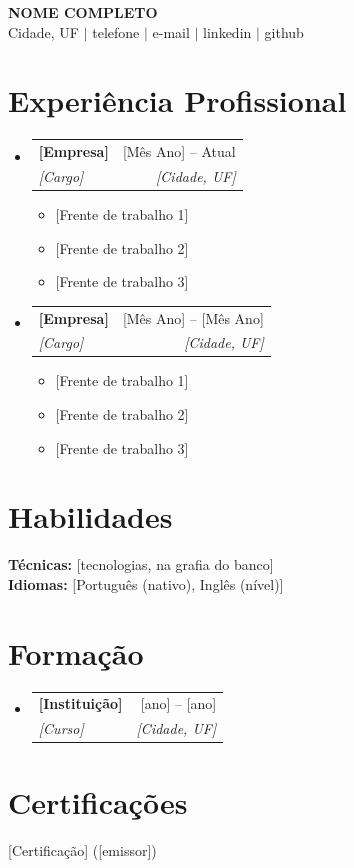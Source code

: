 \documentclass[a4paper,10pt]{article}
\makeatletter
\newcommand{\resumeItem}[1]{
  \item\small{#1 \vspace{-2pt}}
}
\newcommand{\resumeSubheading}[4]{
  \vspace{-1pt}\item
    \begin{tabular*}{\textwidth}[t]{l@{\extracolsep{\fill}}r}
      \textbf{#1} & \small #2 \\
      \textit{\small #3} & \textit{\small #4} \\
    \end{tabular*}\vspace{-5pt}
}
\newcommand{\resumeSubHeadingListStart}{\begin{itemize}[leftmargin=0in, label={}]}
\newcommand{\resumeSubHeadingListEnd}{\end{itemize}}
\newcommand{\resumeItemListStart}{\begin{itemize}[leftmargin=0.15in]}
\newcommand{\resumeItemListEnd}{\end{itemize}\vspace{-2pt}}
\makeatother
\begin{document}

\begin{center}
  {\LARGE \textbf{NOME COMPLETO}} \\[4pt]
  \small
  Cidade, UF $|$
  telefone $|$
  e-mail $|$
  linkedin $|$
  github
\end{center}

\section{Experiência Profissional}
\resumeSubHeadingListStart

  \resumeSubheading
    {[Empresa]}{[Mês Ano] -- Atual}
    {[Cargo]}{[Cidade, UF]}
  \resumeItemListStart
    \resumeItem{[Frente de trabalho 1]}
    \resumeItem{[Frente de trabalho 2]}
    \resumeItem{[Frente de trabalho 3]}
  \resumeItemListEnd

  \resumeSubheading
    {[Empresa]}{[Mês Ano] -- [Mês Ano]}
    {[Cargo]}{[Cidade, UF]}
  \resumeItemListStart
    \resumeItem{[Frente de trabalho 1]}
    \resumeItem{[Frente de trabalho 2]}
    \resumeItem{[Frente de trabalho 3]}
  \resumeItemListEnd

\resumeSubHeadingListEnd

\section{Habilidades}
\begin{itemize}[leftmargin=0in, label={}]
  \small{\item{
    \textbf{Técnicas:} [tecnologias, na grafia do banco] \\
    \textbf{Idiomas:} [Português (nativo), Inglês (nível)]
  }}
\end{itemize}

\section{Formação}
\resumeSubHeadingListStart
  \resumeSubheading
    {[Instituição]}{[ano] -- [ano]}
    {[Curso]}{[Cidade, UF]}
\resumeSubHeadingListEnd

\section{Certificações}
\begin{itemize}[leftmargin=0in, label={}]
  \small{\item{[Certificação] ([emissor])}}
\end{itemize}
\end{document}
